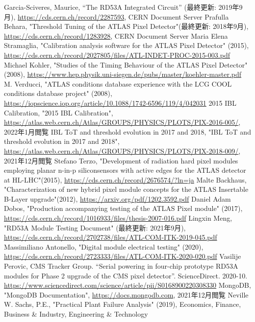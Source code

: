 \begin{thebibliography}{24}
Garcia-Sciveres, Maurice, “The RD53A Integrated Circuit” (最終更新: 2019年9月), \url{https://cds.cern.ch/record/2287593}, CERN Document Server
Prafulla Behara, "Threshold Tuning of the ATLAS Pixel Detector"(最終更新: 2018年9月), \url{https://cds.cern.ch/record/1283928}, CERN Document Server
Maria Elena Stramaglia, "Calibration analysis software for the ATLAS Pixel Detector" (2015), \url{https://cds.cern.ch/record/2027805/files/ATL-INDET-PROC-2015-003.pdf}
Michael Kohler, "Studies of the Timing Behaviour of the ATLAS Pixel Detector"(2008), \url{https://www.hep.physik.uni-siegen.de/pubs/master/koehler-master.pdf}
M. Verducci, "ATLAS conditions database experience with the LCG COOL conditions database project" (2008),
\url{https://iopscience.iop.org/article/10.1088/1742-6596/119/4/042031}
2015 IBL Calibration, "2015 IBL Calibration", \url{https://atlas.web.cern.ch/Atlas/GROUPS/PHYSICS/PLOTS/PIX-2016-005/}, 2022年1月閲覧
IBL ToT and threshold evolution in 2017 and 2018, "IBL ToT and threshold evolution in 2017 and 2018", \url{https://atlas.web.cern.ch/Atlas/GROUPS/PHYSICS/PLOTS/PIX-2018-009/}, 2021年12月閲覧
Stefano Terzo, "Development of radiation hard pixel modules employing planar n-in-p siliconsensors with active edges for the ATLAS detector at HL-LHC"(2015), \url{https://cds.cern.ch/record/2676574/?ln=ja}
Malte Backhaus, "Characterization of new hybrid pixel module concepts for the ATLAS Insertable B-Layer upgrade"(2012), \url{https://arxiv.org/pdf/1202.3592.pdf}
Daniel Adam Dobos, "Production accompanying testing of the ATLAS Pixel module" (2017),
\url{https://cds.cern.ch/record/1016933/files/thesis-2007-016.pdf}
Lingxin Meng, "RD53A Module Testing Document" (最終更新: 2021年9月),
\url{https://cds.cern.ch/record/2702738/files/ATL-COM-ITK-2019-045.pdf}
Massimiliano Antonello, "Digital module electrical testing" (2020),
\url{https://cds.cern.ch/record/2723333/files/ATL-COM-ITK-2020-020.pdf}
Vasilije Perovic, CMS Tracker Group. “Serial powering in four-chip prototype RD53A modules for Phase 2 upgrade of the CMS pixel detector”. ScienceDirect. 2020-10. \url{https://www.sciencedirect.com/science/article/pii/S0168900220308330}
MongoDB, "MongoDB Documentation", \url{https://docs.mongodb.com}, 2021年12月閲覧
Neville W. Sachs, P.E., "Practical Plant Failure Analysis" (2019), Economics, Finance, Business \& Industry, Engineering \& Technology
\end{thebibliography}
